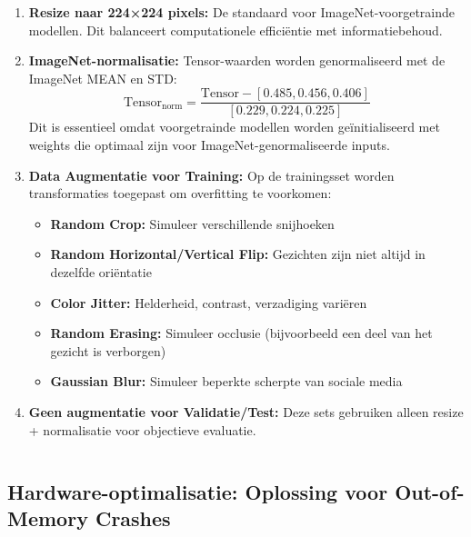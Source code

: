 \begin{enumerate}
    \item \textbf{Resize naar 224×224 pixels:} De standaard voor ImageNet-voorgetrainde modellen. Dit balanceert computationele efficiëntie met informatiebehoud.
    
    \item \textbf{ImageNet-normalisatie:} Tensor-waarden worden genormaliseerd met de ImageNet MEAN en STD:
    $$\text{Tensor}_{\text{norm}} = \frac{\text{Tensor} - [0.485, 0.456, 0.406]}{[0.229, 0.224, 0.225]}$$
    Dit is essentieel omdat voorgetrainde modellen worden geïnitialiseerd met weights die optimaal zijn voor ImageNet-genormaliseerde inputs.
    
    \item \textbf{Data Augmentatie voor Training:} Op de trainingsset worden transformaties toegepast om overfitting te voorkomen:
    \begin{itemize}
        \item \textbf{Random Crop:} Simuleer verschillende snijhoeken
        \item \textbf{Random Horizontal/Vertical Flip:} Gezichten zijn niet altijd in dezelfde oriëntatie
        \item \textbf{Color Jitter:} Helderheid, contrast, verzadiging variëren
        \item \textbf{Random Erasing:} Simuleer occlusie (bijvoorbeeld een deel van het gezicht is verborgen)
        \item \textbf{Gaussian Blur:} Simuleer beperkte scherpte van sociale media
    \end{itemize}
    
    \item \textbf{Geen augmentatie voor Validatie/Test:} Deze sets gebruiken alleen resize + normalisatie voor objectieve evaluatie.
\end{enumerate}

\begin{listing}[H]
    \inputminted[fontsize=\footnotesize, linenos, frame=lines]{python}{code/transforms.py}
    \caption{Python script voor de preprocessing- en augmentatiepipeline.}
    \label{lst:transforms}
\end{listing}

\subsection{Hardware-optimalisatie: Oplossing voor Out-of-Memory Crashes}

